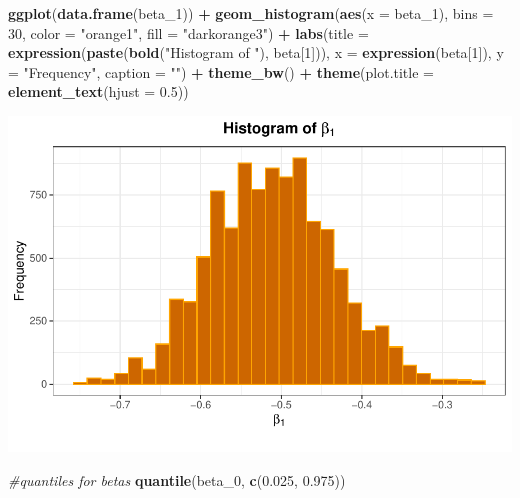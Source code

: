 \documentclass[
]{article}
\newenvironment{Shaded}{\begin{snugshade}}{\end{snugshade}}
\newcommand{\AttributeTok}[1]{\textcolor[rgb]{0.13,0.29,0.53}{#1}}
\newcommand{\CommentTok}[1]{\textcolor[rgb]{0.56,0.35,0.01}{\textit{#1}}}
\newcommand{\DecValTok}[1]{\textcolor[rgb]{0.00,0.00,0.81}{#1}}
\newcommand{\FloatTok}[1]{\textcolor[rgb]{0.00,0.00,0.81}{#1}}
\newcommand{\FunctionTok}[1]{\textcolor[rgb]{0.13,0.29,0.53}{\textbf{#1}}}
\newcommand{\NormalTok}[1]{#1}
\newcommand{\SpecialCharTok}[1]{\textcolor[rgb]{0.81,0.36,0.00}{\textbf{#1}}}
\newcommand{\StringTok}[1]{\textcolor[rgb]{0.31,0.60,0.02}{#1}}
\begin{document}
\begin{Shaded}
\begin{Highlighting}[]
\FunctionTok{ggplot}\NormalTok{(}\FunctionTok{data.frame}\NormalTok{(beta\_1)) }\SpecialCharTok{+}
  \FunctionTok{geom\_histogram}\NormalTok{(}\FunctionTok{aes}\NormalTok{(}\AttributeTok{x =}\NormalTok{ beta\_1), }\AttributeTok{bins =} \DecValTok{30}\NormalTok{, }\AttributeTok{color =} \StringTok{"orange1"}\NormalTok{, }\AttributeTok{fill =} \StringTok{"darkorange3"}\NormalTok{) }\SpecialCharTok{+}
  \FunctionTok{labs}\NormalTok{(}\AttributeTok{title =} \FunctionTok{expression}\NormalTok{(}\FunctionTok{paste}\NormalTok{(}\FunctionTok{bold}\NormalTok{(}\StringTok{"Histogram of "}\NormalTok{), beta[}\DecValTok{1}\NormalTok{])), }
       \AttributeTok{x =} \FunctionTok{expression}\NormalTok{(beta[}\DecValTok{1}\NormalTok{]), }\AttributeTok{y =} \StringTok{"Frequency"}\NormalTok{, }
       \AttributeTok{caption =} \StringTok{""}\NormalTok{) }\SpecialCharTok{+}
  \FunctionTok{theme\_bw}\NormalTok{() }\SpecialCharTok{+}
  \FunctionTok{theme}\NormalTok{(}\AttributeTok{plot.title =} \FunctionTok{element\_text}\NormalTok{(}\AttributeTok{hjust =} \FloatTok{0.5}\NormalTok{))}
\end{Highlighting}
\end{Shaded}

\includegraphics{Homework_6_files/figure-latex/prob4b-4.pdf}

\begin{Shaded}
\begin{Highlighting}[]
\CommentTok{\#quantiles for betas}
\FunctionTok{quantile}\NormalTok{(beta\_0, }\FunctionTok{c}\NormalTok{(}\FloatTok{0.025}\NormalTok{, }\FloatTok{0.975}\NormalTok{))}
\end{Highlighting}
\end{Shaded}
\end{document}
